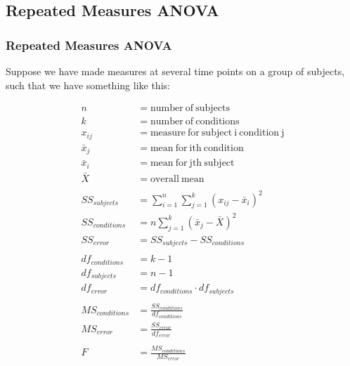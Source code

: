 \documentclass{beamer} %
\begin{document}
	\subsection*{Repeated Measures ANOVA}
	\begin{frame}
		\frametitle{Repeated Measures ANOVA}
		Suppose we have made measures at several time points on a group of subjects, such that we have something like this:

		\begin{align*}
		    n &= \mathrm{number~of~subjects} \\
		    k &= \mathrm{number~of~conditions} \\
		    x_{ij} &= \mathrm{measure~for~subject~i~condition~j} \\
		    \bar{x}_j &= \mathrm{mean~for~ith~condition} \\
		    \bar{x}_i &= \mathrm{mean~for~jth~subject} \\
		    \bar{X} &= \mathrm{overall~mean} \\
		    ~&\\
		    SS_{subjects} &= \sum_{i=1}^n \sum_{j=1}^k (x_{ij} - \bar{x}_i)^2 \\
		    SS_{conditions} &=  n \sum_{j=1}^k (\bar{x}_j - \bar{X})^2 \\
		    SS_{error} &= SS_{subjects} - SS_{conditions} \\
		    ~&\\
		    df_{conditions} &= k-1 \\
		    df_{subjects} &= n-1 \\
		    df_{error} &= df_{conditions} \cdot df_{subjects} \\
		    ~&\\
		    MS_{conditions} &= \frac{SS_{conditions}}{df_{conditions}} \\
		    MS_{error} &= \frac{SS_{error}}{df_{error}} \\
		    ~&\\
		    F &= \frac{MS_{conditions}}{MS_{error}}
		\end{align*}
	\end{frame}
\end{document}
